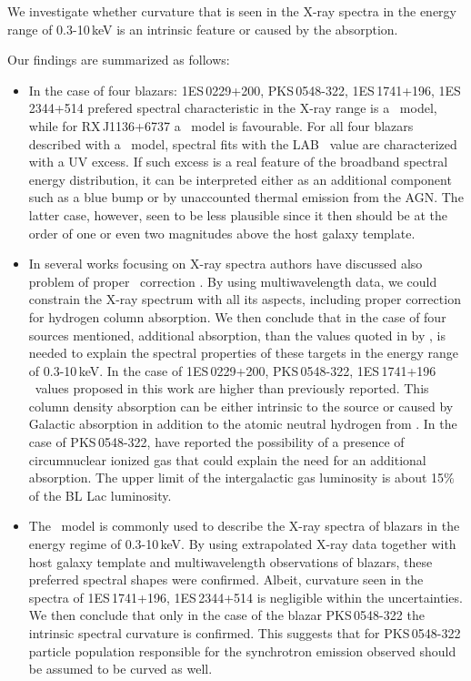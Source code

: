 We investigate whether curvature that is seen in the X-ray spectra in the energy range of 0.3-10\,keV is an intrinsic feature or caused by the absorption.

Our findings are summarized as follows:

\begin{itemize}

 \item  In the case of four blazars: 1ES\,0229+200, PKS\,0548-322,  1ES\,1741+196, 1ES\,2344+514 prefered spectral characteristic in the X-ray range is a \lp\ model, while for RX\,J1136+6737 a \po\ model is favourable. For all four blazars described with a \lp\ model, spectral fits with the LAB \nh\ value are characterized with a UV excess. 
 If such excess is a real feature of the broadband spectral energy distribution, it can be interpreted either as an additional component such as a blue bump or by unaccounted thermal emission from the AGN.  The latter case, however, seen to be less plausible since it then should be at the order of one or even two magnitudes above the host galaxy template.  
 
 
  \item In several works focusing on X-ray spectra authors have discussed also problem of proper \nh\ correction \citep[e.g.][]{Acciari_wcom, Wierzcholska2016}.
By using multiwavelength data, we could constrain the X-ray spectrum with all its aspects, including proper correction for hydrogen column absorption. 
 We then conclude that in the case of four sources mentioned, additional absorption,  than the values quoted in by \cite{Kalberla2005}, is needed to explain the spectral properties of these targets in the energy range of 0.3-10\,keV. In the case of 1ES\,0229+200, PKS\,0548-322, 1ES\,1741+196 \nh\ values proposed in this work are higher than previously reported. 
 This column density absorption can be either intrinsic to the source or caused by Galactic absorption in addition to the atomic neutral hydrogen from \cite{Kalberla2005}.
 In the case of PKS\,0548-322, \cite{Sambruna_1998} have reported the possibility of a presence of circumnuclear ionized gas that could explain the need for an additional absorption.
The upper limit of the intergalactic gas luminosity is about 15$\%$ of the BL Lac luminosity.

  
 
 \item The \lp\ model is commonly used to describe the X-ray spectra of blazars in the energy regime of 0.3-10\,keV. 
 By using extrapolated X-ray data together with host galaxy template and multiwavelength observations of blazars,  these preferred spectral shapes were confirmed. 
Albeit, curvature seen in the spectra of 1ES\,1741+196, 1ES\,2344+514 is negligible within the uncertainties.
 We then conclude that only in the case of the blazar PKS\,0548-322 the intrinsic spectral curvature is confirmed. 
 This suggests that for PKS\,0548-322 particle population responsible for the synchrotron emission observed should be assumed to be curved as well. 


\end{itemize}
